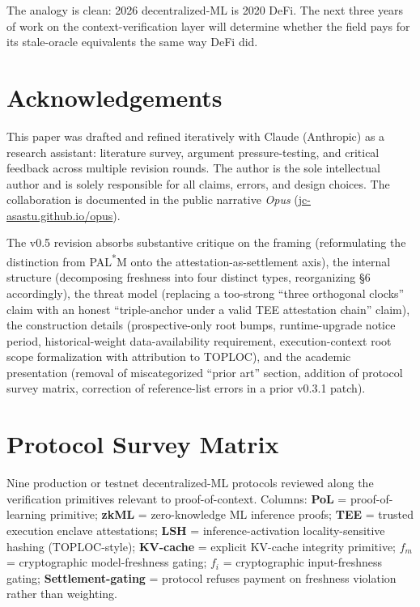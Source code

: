 \documentclass[11pt]{article}
\begin{document}
The analogy is clean: 2026 decentralized-ML is 2020 DeFi. The next three years of work on the context-verification layer will determine whether the field pays for its stale-oracle equivalents the same way DeFi did.

\section*{Acknowledgements}

This paper was drafted and refined iteratively with Claude (Anthropic) as a research assistant: literature survey, argument pressure-testing, and critical feedback across multiple revision rounds. The author is the sole intellectual author and is solely responsible for all claims, errors, and design choices. The collaboration is documented in the public narrative \emph{Opus} (\href{https://jc-asastu.github.io/opus/}{jc-asastu.github.io/opus}).

The v0.5 revision absorbs substantive critique on the framing (reformulating the distinction from PAL\textsuperscript{*}M onto the attestation-as-settlement axis), the internal structure (decomposing freshness into four distinct types, reorganizing \S6 accordingly), the threat model (replacing a too-strong ``three orthogonal clocks'' claim with an honest ``triple-anchor under a valid TEE attestation chain'' claim), the construction details (prospective-only root bumps, runtime-upgrade notice period, historical-weight data-availability requirement, execution-context root scope formalization with attribution to TOPLOC), and the academic presentation (removal of miscategorized ``prior art'' section, addition of protocol survey matrix, correction of reference-list errors in a prior v0.3.1 patch).

\appendix

\section{Protocol Survey Matrix}

Nine production or testnet decentralized-ML protocols reviewed along the verification primitives relevant to proof-of-context. Columns: \textbf{PoL} = proof-of-learning primitive; \textbf{zkML} = zero-knowledge ML inference proofs; \textbf{TEE} = trusted execution enclave attestations; \textbf{LSH} = inference-activation locality-sensitive hashing (TOPLOC-style); \textbf{KV-cache} = explicit KV-cache integrity primitive; \textbf{$f_m$} = cryptographic model-freshness gating; \textbf{$f_i$} = cryptographic input-freshness gating; \textbf{Settlement-gating} = protocol refuses payment on freshness violation rather than weighting.
\end{document}
